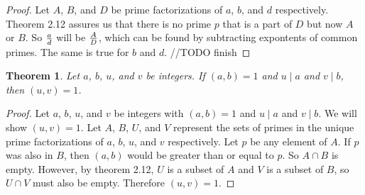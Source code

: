 \documentclass[12pt,leqno]{article}
\numberwithin{equation}{section}
\newtheorem{thm}{Theorem}[section]
\theoremstyle{definition}
\begin{document}
\begin{proof}[Proof]
Let $A$, $B$, and $D$  be prime factorizations of $a$, $b$, and $d$ respectively.  Theorem 2.12 assures us that there is no prime $p$ that is a part of $D$ but now $A$ or $B$.  So $a \over d$ will be $A \over D$, which can be found by subtracting expontents of common primes.  The same is true for $b$ and $d$.  //TODO finish




\end{proof}


\begin{thm}
Let $a$, $b$, $u$, and $v$ be integers.  If $(a, b) = 1$ and $u \mid a$ and $v \mid b$, then $(u, v) = 1$.
\end{thm}

\begin{proof}[Proof]
Let $a$, $b$, $u$, and $v$ be integers with $(a, b) = 1$ and $u \mid a$ and $v \mid b$. We will show $(u, v) = 1$. Let $A$, $B$, $U$, and $V$ represent the sets of primes in the unique prime factorizations of $a$, $b$, $u$, and $v$ respectively.  Let $p$ be any element of $A$.  If $p$ was also in $B$, then $(a, b)$ would be greater than or equal to $p$.  So $A \cap B$ is empty.  However, by theorem 2.12, $U$ is a subset of $A$ and $V$ is a subset of $B$, so $U \cap V$ must also be empty.  Therefore $(u, v) = 1$.
\end{proof}
\end{document}
